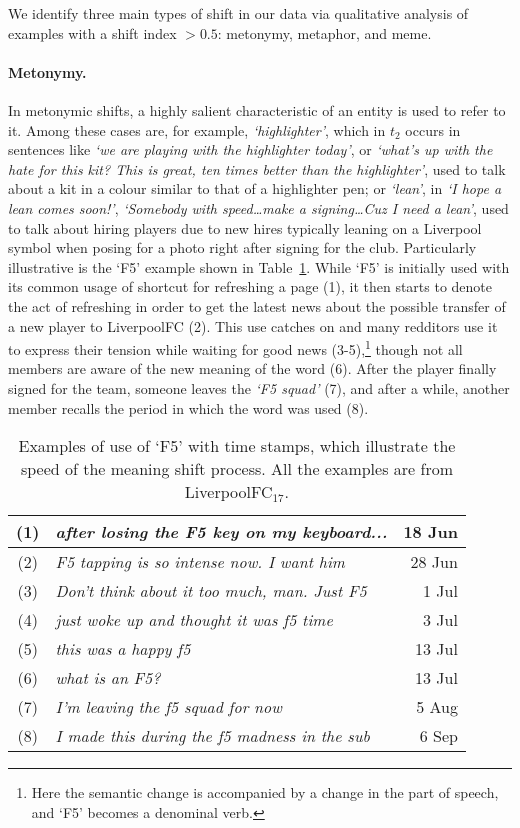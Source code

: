 We identify three main types of shift in our data via qualitative analysis of examples with a shift index $> 0.5$: metonymy, metaphor, and meme.  

\paragraph{Metonymy.}
In metonymic shifts, a highly salient characteristic of an entity is used to refer to it. Among these cases are, for example, {\em `highlighter'}, which in $t_2$ occurs in sentences like \textit{`we are playing with the highlighter today'}, or \textit{`what's up with the hate for this kit? This is great, ten times better than the highlighter'},
used to talk about a kit in a colour similar to that of a highlighter pen; or {\em `lean'}, in \textit{`I hope a lean comes soon!'}, \textit{`Somebody with speed\dots make a signing\dots Cuz I need a lean'},
used to talk about hiring players due to new hires typically leaning on a Liverpool symbol when posing for a photo right after signing for the club. Particularly illustrative is the `F5' example shown in
Table~\ref{table:f5}. While `F5' is initially used with its common usage of shortcut for refreshing a page (1), it then starts to denote the act of refreshing in order to get the latest news about the possible transfer of a new player to LiverpoolFC (2). This use catches on and many redditors use it to express their tension while waiting for good news (3-5),\footnote{Here the semantic change is accompanied by a change in the part of speech, and `F5' becomes a denominal verb.}
though not all members are aware of the new meaning of the word (6). After the player finally signed for the team, someone leaves the {\em `F5 squad'} (7), and after a while, another member recalls the period in which the word was used (8).

\begin{table}[t]\centering
    \begin{tabular}{@{}cp{5.5cm}r@{}}
        \hline
        (1) & \em after losing the F5 key on my keyboard... & 18 Jun\\\hline
        (2) & \em F5 tapping is so intense now. I want him & 28 Jun\\\hline
        (3) & \em Don't think about it too much, man. Just F5 & 1 Jul\\\hline
        (4) & \em just woke up and thought it was f5 time & 3 Jul\\\hline
        (5) & \em this was a happy f5 & 13 Jul\\\hline
        (6) & \em what is an F5? & 13 Jul \\\hline
        (7) & \em I'm leaving the f5 squad for now & 5 Aug\\\hline
        (8) & \em I made this during the f5 madness in the sub & 6 Sep\\\hline      
    \end{tabular}
    \caption{Examples of use of `F5' with time stamps, which illustrate the speed of the meaning shift process. All the examples are from LiverpoolFC$_{17}$.}
     \label{table:f5}
\end{table}

